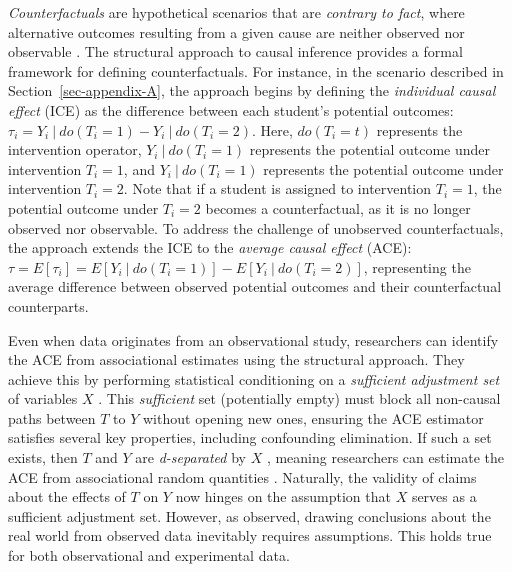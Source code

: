 \documentclass[
  authoryear,
  review,
  1p]{elsarticle}
\begin{document}
\emph{Counterfactuals} are hypothetical scenarios that are
\emph{contrary to fact}, where alternative outcomes resulting from a
given cause are neither observed nor observable
\citep{Neal_2020, Counterfactual_2024}. The structural approach to
causal inference \citep{Pearl_2009, Pearl_et_al_2016} provides a formal
framework for defining counterfactuals. For instance, in the scenario
described in Section~\ref{sec-appendix-A}, the approach begins by
defining the \emph{individual causal effect} (ICE) as the difference
between each student's potential outcomes:
\(\tau_{i} = Y_{i} \: | \: do(T_{i}=1) - Y_{i} \: | \: do(T_{i}=2)\).
Here, \(do(T_{i}=t)\) represents the intervention operator,
\(Y_{i} \: | \: do(T_{i}=1)\) represents the potential outcome under
intervention \(T_{i}=1\), and \(Y_{i} \: | \: do(T_{i}=1)\) represents
the potential outcome under intervention \(T_{i}=2\). Note that if a
student is assigned to intervention \(T_{i}=1\), the potential outcome
under \(T_{i}=2\) becomes a counterfactual, as it is no longer observed
nor observable. To address the challenge of unobserved counterfactuals,
the approach extends the ICE to the \emph{average causal effect} (ACE):
\(\tau = E[\tau_{i}] = E[Y_{i} \: | \: do(T_{i}=1)]- E[Y_{i} \: | \: do(T_{i}=2)]\),
representing the average difference between observed potential outcomes
and their counterfactual counterparts.

Even when data originates from an observational study, researchers can
identify the ACE from associational estimates using the structural
approach. They achieve this by performing statistical conditioning on a
\emph{sufficient adjustment set} of variables \(X\)
\citep{Pearl_2009, Pearl_et_al_2016, Morgan_et_al_2014}. This
\emph{sufficient} set (potentially empty) must block all non-causal
paths between \(T\) to \(Y\) without opening new ones, ensuring the ACE
estimator satisfies several key properties, including confounding
elimination. If such a set exists, then \(T\) and \(Y\) are
\emph{d-separated} by \(X\) \citep{Pearl_2009}, meaning researchers can
estimate the ACE from associational random quantities
\citep{Morgan_et_al_2014}. Naturally, the validity of claims about the
effects of \(T\) on \(Y\) now hinges on the assumption that \(X\) serves
as a sufficient adjustment set. However, as
\citet[pp.~150]{Kohler_et_al_2019} observed, drawing conclusions about
the real world from observed data inevitably requires assumptions. This
holds true for both observational and experimental data.
\end{document}
